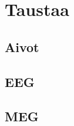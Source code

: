 \section{Taustaa}
\subsection{Aivot}
\cite[s. 50]{niedermeyer2011niedermeyer}

\subsection{EEG}
\citep{niedermeyer2011niedermeyer}

\citep{Michel2004EEGImaging}

\citep{Nunez2006ElectricEEG}

\citep{Baillet2001ElectromagneticMapping}

\subsection{MEG}
\citep{Hamalainen1993MagnetoencephalographytheoryBrain}

\citep{niedermeyer2011niedermeyer}

\citep{Baillet2001ElectromagneticMapping}